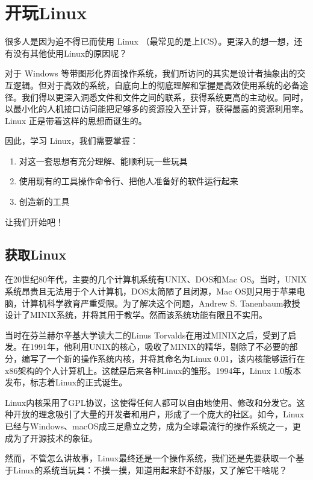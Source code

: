 \chapter{开玩Linux}\label{chap:play-with-linux}

很多人是因为迫不得已而使用 Linux \faLinux（最常见的是上ICS）。更深入的想一想，还有没有其他使用Linux的原因呢？

对于 Windows 等带图形化界面操作系统，我们所访问的其实是设计者抽象出的交互逻辑。但对于高效的系统，自底向上的彻底理解和掌握是高效使用系统的必备途径。我们得以更深入洞悉文件和文件之间的联系，获得系统更高的主动权。同时，以最小化的人机接口访问能把足够多的资源投入至计算，获得最高的资源利用率。Linux 正是带着这样的思想而诞生的。

因此，学习 Linux，我们需要掌握：

\begin{enumerate}
  \item 对这一套思想有充分理解、能顺利玩一些玩具
  \item 使用现有的工具操作命令行、把他人准备好的软件运行起来
  \item 创造新的工具
\end{enumerate}

让我们开始吧！

\section{获取Linux}

在20世纪80年代，主要的几个计算机系统有UNIX、DOS和Mac OS。当时，UNIX系统昂贵且无法用于个人计算机，DOS太简陋了且闭源，Mac OS则只用于苹果电脑，计算机科学教育严重受限。为了解决这个问题，Andrew S. Tanenbaum教授设计了MINIX系统，并将其用于教学。然而该系统功能有限且不实用。

当时在芬兰赫尔辛基大学读大二的Linus Torvalds在用过MINIX之后，受到了启发。在1991年，他利用UNIX的核心，吸收了MINIX的精华，剔除了不必要的部分，编写了一个新的操作系统内核，并将其命名为Linux 0.01，该内核能够运行在x86架构的个人计算机上。这就是后来各种Linux的雏形。1994年，Linux 1.0版本发布，标志着Linux的正式诞生。

Linux内核采用了GPL协议，这使得任何人都可以自由地使用、修改和分发它。这种开放的理念吸引了大量的开发者和用户，形成了一个庞大的社区。如今，Linux已经与Windows、macOS成三足鼎立之势，成为全球最流行的操作系统之一，更成为了开源技术的象征。

然而，不管怎么讲故事，Linux最终还是一个操作系统，我们还是先要获取一个基于Linux的系统当玩具：不摸一摸，知道用起来舒不舒服，又了解它干啥呢？

